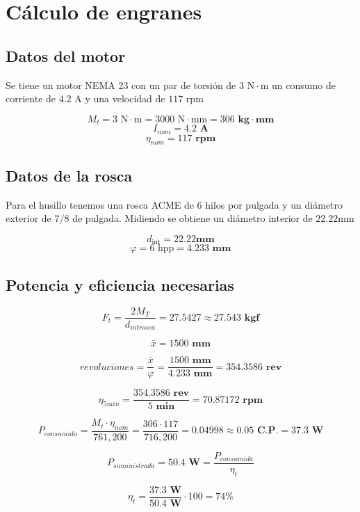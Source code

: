 \chapter{Cálculo de engranes}\label{apendice3}

\section{Datos del motor}

Se tiene un motor NEMA 23 con un par de torsión de $3 \text{ N}\cdot\text{m} $ un consumo de corriente de $4.2 \text{ A} $ y una velocidad de $ 117 \text{ rpm} $

$$ M_t = 3 \text{ N} \cdot \text{m} = 3000 \text{ N}\cdot \text{mm} = 306 \textbf{ kg} \cdot \textbf{mm} $$
$$ I_{nom}= 4.2 \textbf{ A}$$
$$\eta_{nom} = 117 \textbf{ rpm}$$

\section{Datos de la rosca}

Para el husillo tenemos una rosca ACME de 6 hilos por pulgada y un diámetro exterior de $ 7/8 $ de pulgada. Midiendo se obtiene un diámetro interior de $22.22 \text{mm} $

$$ d_{\text{int}} = 22.22 \textbf{mm} $$
$$ \varphi = 6 \text{ hpp} = 4.233 \textbf{ mm}$$ 
    
\section{Potencia y eficiencia necesarias}

$$F_t = \frac{2M_T}{d_{int rosca}}=27.5427 \approx 27.543 \textbf{ kgf}$$

$$\bar{x} = 1500 \textbf{ mm}$$

$$revoluciones = \frac{\bar{x}}{\varphi} = \frac{1500 \textbf{ mm} }{4.233 \textbf{ mm}} = 354.3586 \textbf{ rev}$$

$$ \eta_{ 5min} = \frac{354.3586 \textbf{ rev}}{5 \textbf{ min}} = 70.87172 \textbf{ rpm}$$

$$P_{consumida} = \frac{M_t \cdot \eta_{nom}}{761,200} = \frac{306 \cdot 117}{716,200}= 0.04998 \approx 0.05 \textbf{ C.P.} = 37.3 \textbf{ W}$$

$$P_{suministrada} = 50.4 \textbf{ W} = \frac{P_{consumida}}{\eta_{t}}$$

$$ \eta_{t} = \frac{37.3 \textbf{ W}}{50.4 \textbf{ W}} \cdot 100 = 74\% $$

